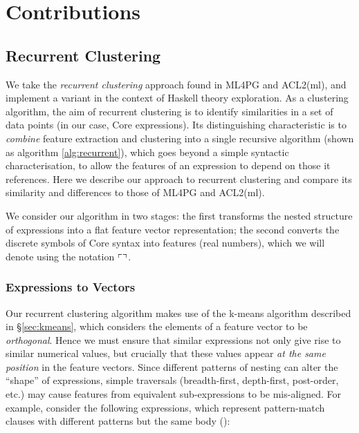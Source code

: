 \section{Contributions}
\label{sec:contributions}

\subsection{Recurrent Clustering}
\label{sec:recurrentclustering}

\iffalse TODO: Focus the section more on the problem of identifiers, and how recurrent clustering uses clustering as part of feature extraction to solve this \fi

We take the \emph{recurrent clustering} approach found in ML4PG and ACL2(ml), and implement a variant in the context of Haskell theory exploration. As a clustering algorithm, the aim of recurrent clustering is to identify similarities in a set of data points (in our case, Core expressions). Its distinguishing characteristic is to \emph{combine} feature extraction and clustering into a single recursive algorithm (shown as algorithm \ref{alg:recurrent}), which goes beyond a simple syntactic characterisation, to allow the features of an expression to depend on those it references. Here we describe our approach to recurrent clustering and compare its similarity and differences to those of ML4PG and ACL2(ml).

We consider our algorithm in two stages: the first transforms the nested structure of expressions into a flat feature vector representation; the second converts the discrete symbols of Core syntax into features (real numbers), which we will denote using the notation $\left\ulcorner  \right\urcorner$.

\subsubsection{Expressions to Vectors}

Our recurrent clustering algorithm makes use of the k-means algorithm described in \S \ref{sec:kmeans}, which considers the elements of a feature vector to be \emph{orthogonal}. Hence we must ensure that similar expressions not only give rise to similar numerical values, but crucially that these values appear \emph{at the same position} in the feature vectors. Since different patterns of nesting can alter the ``shape'' of expressions, simple traversals (breadth-first, depth-first, post-order, etc.) may cause features from equivalent sub-expressions to be mis-aligned. For example, consider the following expressions, which represent pattern-match clauses with different patterns but the same body ():

